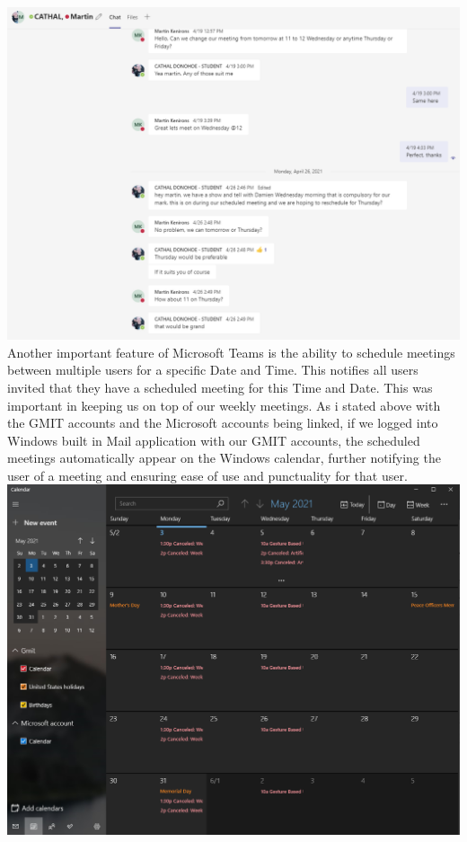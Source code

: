 \includegraphics[scale=0.4]{img/teams.PNG}\newline
Another important feature of Microsoft Teams is the ability to schedule meetings between multiple users for a specific Date and Time. This notifies all users invited that they have a scheduled meeting for this Time and Date. This was important in keeping us on top of our weekly meetings. As i stated above with the GMIT accounts and the Microsoft accounts being linked, if we logged into Windows built in Mail application with our GMIT accounts, the scheduled meetings automatically appear on the Windows calendar, further notifying the user of a meeting and ensuring ease of use and punctuality for that user.\newline
\includegraphics[scale=0.4]{img/Caledar.PNG} \newline
